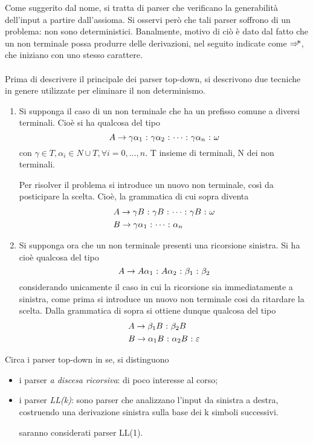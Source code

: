 \documentclass{subfiles}
\begin{document}
Come suggerito dal nome, si tratta di parser che verificano la generabilità dell'input a partire dall'assioma.
Si osservi però che tali parser soffrono di un problema: non sono deterministici.
Banalmente, motivo di ciò è dato dal fatto che un non terminale possa produrre delle derivazioni, nel seguito indicate come \(\operatorname{\Rightarrow\hspace{-5pt}*}\),
che iniziano con uno stesso carattere.
\\ \\
Prima di descrivere il principale dei parser top-down, si descrivono due tecniche in genere utilizzate per eliminare il non determinismo.
\begin{enumerate}
    \item Si supponga il caso di un non terminale che ha un prefisso comune a diversi terminali.
          Cioè si ha qualcosa del tipo
          \[
              \Grammar{A}{\gamma \alpha_{1}}[\gamma \alpha_{2}, \cdots, \gamma \alpha_{n}, \omega]
          \]
          con \(\gamma \in T, \alpha_{i} \in N \cup T, \forall i = 0, \ldots, n\). T insieme di terminali, N dei non terminali.

          Per risolver il problema si introduce un nuovo non terminale, così da posticipare la scelta.
          Cioè, la grammatica di cui sopra diventa
          \[\begin{aligned}
                   & \Grammar{A}{\gamma B}[\gamma B, \cdots, \gamma B, \omega] \\
                   & \Grammar{B}{\gamma \alpha_{1}}[\cdots, \alpha_{n}]        \\
              \end{aligned}\]
    \item Si supponga ora che un non terminale presenti una ricorsione sinistra.
          Si ha cioè qualcosa del tipo
          \[
              \Grammar{A}{A \alpha_{1}}[A \alpha_{2}, \beta_{1}, \beta_{2}]
          \]
          considerando unicamente il caso in cui la ricorsione sia immediatamente a sinistra,
          come prima si introduce un nuovo non terminale cosi da ritardare la scelta.
          Dalla grammatica di sopra si ottiene dunque qualcosa del tipo
          \[\begin{aligned}
                   & \Grammar{A}{\beta_{1} B}[\beta_{2} B]                \\
                   & \Grammar{B}{\alpha_{1} B}[\alpha_{2} B, \varepsilon] \\
              \end{aligned}\]
\end{enumerate}
Circa i parser top-down in se, si distinguono
\begin{itemize}
    \item i parser \emph{a discesa ricorsiva}: di poco interesse al corso;
    \item i parser \emph{LL(k)}: sono parser che analizzano l'input da sinistra a destra,
          costruendo una derivazione sinistra sulla base dei k simboli successivi.
          \begin{Note*}
              saranno considerati parser LL(1).
          \end{Note*}
\end{itemize}
\end{document}
